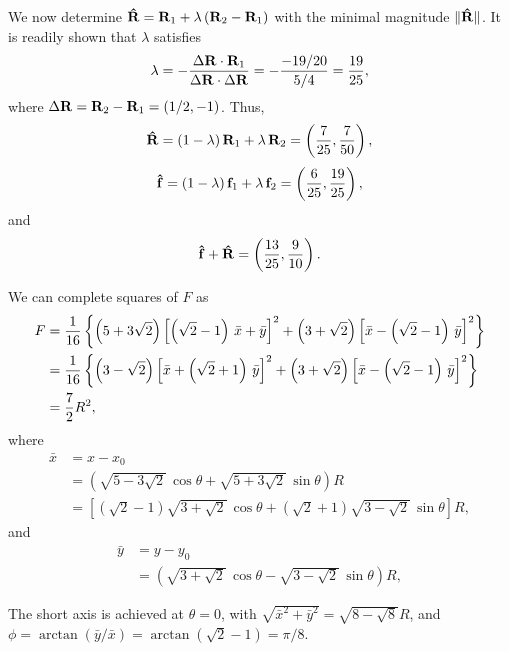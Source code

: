 \documentclass[aip,jcp,preprint,notitlepage, superscriptaddress]{revtex4-1}
\begin{document}
We now determine
$\mathbf{\hat R} = \mathbf{R}_1 + \lambda \, (\mathbf{R}_2 - \mathbf{R}_1)$
with the minimal magnitude
$\| \mathbf{\hat R} \|$.
%
It is readily shown that
$\lambda$ satisfies
%
\[
\lambda
=
-\frac{
  \Delta \mathbf{R} \cdot \mathbf{R}_1
}
{
  \Delta \mathbf{R} \cdot \Delta \mathbf{R}
}
=
-\frac{-19/20}{5/4}
=
\frac{19}{25},
\]
%
where
$\Delta \mathbf{R} = \mathbf{R}_2 - \mathbf{R}_1 = (1/2, -1)$.
%
Thus,
\[
\mathbf{\hat R}
=
(1 - \lambda) \, \mathbf{R}_1
+ \lambda \, \mathbf{R}_2
=
\left(
  \frac{7}{25},
  \frac{7}{50}
\right),
\]
\[
\mathbf{\hat f}
=
(1 - \lambda) \, \mathbf{f}_1
+ \lambda \, \mathbf{f}_2
=
\left(
  \frac{6}{25},
  \frac{19}{25}
\right),
\]
and
\[
\mathbf{\hat f}
+
\mathbf{\hat R}
=
\left(
  \frac{13}{25},
  \frac{9}{10}
\right).
\]



We can complete squares of $F$ as
%
\begin{align*}
F
&=
\frac{1}{16}
\left\{
  \left( 5 + 3 \sqrt 2 \right)
  \left[
    \left( \sqrt 2 - 1 \right) \, \bar x
  +
    \bar y
  \right]^2
  +
  \left( 3 + \sqrt 2 \right)
  \left[
    \bar x
  -
    \left( \sqrt 2 - 1 \right) \, \bar y
  \right]^2
\right\}
\notag \\
%
&=
\frac{1}{16}
\left\{
  \left( 3 - \sqrt 2 \right)
  \left[
    \bar x
  +
    \left( \sqrt 2 + 1 \right) \, \bar y
  \right]^2
  +
  \left( 3 + \sqrt 2 \right)
  \left[
    \bar x
  -
    \left( \sqrt 2 - 1 \right) \, \bar y
  \right]^2
\right\}
\notag \\
%
&=
\frac{7}{2} R^2,
\end{align*}
%
where
%
\begin{align*}
\bar x
&= x - x_0
\\
&=
\left(
  \sqrt{ 5 - 3 \sqrt{2} } \, \cos \theta
  +
  \sqrt{ 5 + 3 \sqrt{2} } \, \sin \theta
\right) R
\\
&=
\left[
  \left( \sqrt 2 - 1 \right) \sqrt{ 3 + \sqrt{2} } \, \cos \theta
  +
  \left( \sqrt 2 + 1 \right) \sqrt{ 3 - \sqrt{2} } \, \sin \theta
\right] R,
\end{align*}
%
and
%
\begin{align*}
\bar y
&= y - y_0
\\
&=
\left(
  \sqrt{ 3 + \sqrt{2} } \, \cos \theta
  -
  \sqrt{ 3 - \sqrt{2} } \, \sin \theta
\right) R,
\end{align*}



The short axis is achieved at $\theta = 0$,
with
$\sqrt{ {\bar x}^2 + {\bar y}^2 } = \sqrt{ 8 - \sqrt 8 } R$,
and
$\phi = \arctan(\bar y/\bar x) = \arctan \left(\sqrt 2 - 1\right) = \pi/8$.
\end{document}
